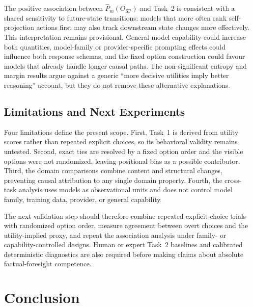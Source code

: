 \documentclass[pdflatex,sn-mathphys-num]{sn-jnl}%
\theoremstyle{thmstyleone}%
\theoremstyle{thmstyletwo}%
\theoremstyle{thmstylethree}%
\begin{document}
The positive association between $\widehat P_m(O_{\mathrm{SP}})$ and Task~2 is consistent with a shared sensitivity to future-state transitions: models that more often rank self-projection actions first may also track downstream state changes more effectively. This interpretation remains provisional. General model capability could increase both quantities, model-family or provider-specific prompting effects could influence both response schemas, and the fixed option construction could favour models that already handle longer causal paths. The non-significant entropy and margin results argue against a generic ``more decisive utilities imply better reasoning'' account, but they do not remove these alternative explanations.

\subsection{Limitations and Next Experiments}

Four limitations define the present scope. First, Task~1 is derived from utility scores rather than repeated explicit choices, so its behavioral validity remains untested. Second, exact ties are resolved by a fixed option order and the visible options were not randomized, leaving positional bias as a possible contributor. Third, the domain comparisons combine content and structural changes, preventing causal attribution to any single domain property. Fourth, the cross-task analysis uses models as observational units and does not control model family, training data, provider, or general capability.

The next validation step should therefore combine repeated explicit-choice trials with randomized option order, measure agreement between overt choices and the utility-implied proxy, and repeat the association analysis under family- or capability-controlled designs. Human or expert Task~2 baselines and calibrated deterministic diagnostics are also required before making claims about absolute factual-foresight competence.

\section{Conclusion}
\label{sec:mttravel-conclusion}
\end{document}
